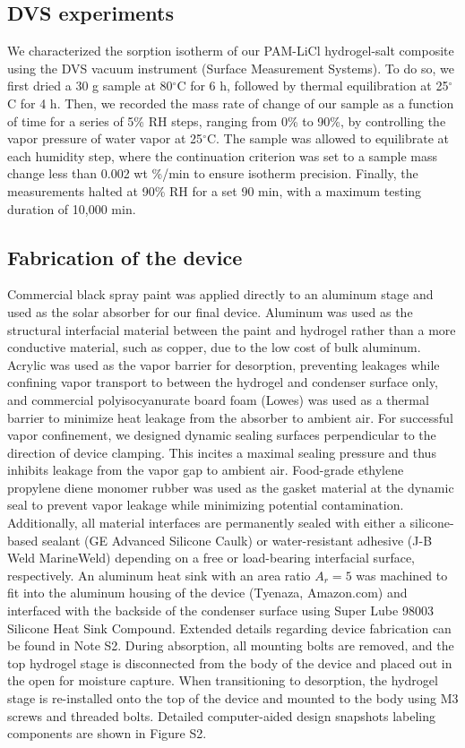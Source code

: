\documentclass[11pt]{article}
\begin{document}
\subsection{DVS experiments}

We characterized the sorption isotherm of our PAM-LiCl hydrogel-salt composite using the DVS vacuum instrument (Surface Measurement Systems). To do so, we first dried a 30 g sample at 80$^{\circ}$C for 6 h, followed by thermal equilibration at 25$^{\circ}$C for 4 h. Then, we recorded the mass rate of change of our sample as a function of time for a series of 5\% RH steps, ranging from 0\% to 90\%, by controlling the vapor pressure of water vapor at 25$^{\circ}$C. The sample was allowed to equilibrate at each humidity step, where the continuation criterion was set to a sample mass change less than 0.002 wt \%/min to ensure isotherm precision. Finally, the measurements halted at 90\% RH for a set 90 min, with a maximum testing duration of 10,000 min.

\subsection{Fabrication of the device}

Commercial black spray paint was applied directly to an aluminum stage and used as the solar absorber for our final device. Aluminum was used as the structural interfacial material between the paint and hydrogel rather than a more conductive material, such as copper, due to the low cost of bulk aluminum. Acrylic was used as the vapor barrier for desorption, preventing leakages while confining vapor transport to between the hydrogel and condenser surface only, and commercial polyisocyanurate board foam (Lowes) was used as a thermal barrier to minimize heat leakage from the absorber to ambient air. For successful vapor confinement, we designed dynamic sealing surfaces perpendicular to the direction of device clamping. This incites a maximal sealing pressure and thus inhibits leakage from the vapor gap to ambient air. Food-grade ethylene propylene diene monomer rubber was used as the gasket material at the dynamic seal to prevent vapor leakage while minimizing potential contamination. Additionally, all material interfaces are permanently sealed with either a silicone-based sealant (GE Advanced Silicone Caulk) or water-resistant adhesive (J-B Weld MarineWeld) depending on a free or load-bearing interfacial surface, respectively. An aluminum heat sink with an area ratio $A_{r} = 5$ was machined to fit into the aluminum housing of the device (Tyenaza, Amazon.com) and interfaced with the backside of the condenser surface using Super Lube 98003 Silicone Heat Sink Compound. Extended details regarding device fabrication can be found in Note S2. During absorption, all mounting bolts are removed, and the top hydrogel stage is disconnected from the body of the device and placed out in the open for moisture capture. When transitioning to desorption, the hydrogel stage is re-installed onto the top of the device and mounted to the body using M3 screws and threaded bolts. Detailed computer-aided design snapshots labeling components are shown in Figure S2.
\end{document}

